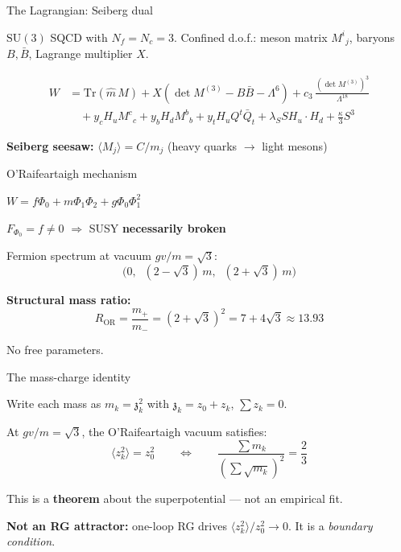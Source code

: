\documentclass[aspectratio=169,12pt]{beamer}
\newcommand{\zch}{\mathfrak{z}}
\begin{document}
\begin{frame}{The Lagrangian: Seiberg dual}

$\mathrm{SU}(3)$ SQCD with $N_f = N_c = 3$.
Confined d.o.f.: meson matrix $M^i{}_j$, baryons $B, \bar B$,
Lagrange multiplier $X$.

\begin{equation*}
\begin{split}
W &= \mathrm{Tr}(\hat m\, M)
  + X\!\left(\det M^{(3)} - B\bar B - \Lambda^{6}\right)
  + c_3\,\frac{(\det M^{(3)})^3}{\Lambda^{18}}\\
&\quad + y_c H_u M^c{}_c + y_b H_d M^b{}_b
  + y_t H_u Q^t \bar Q_t
  + \lambda_S S H_u\!\cdot\!H_d + \tfrac{\kappa}{3}S^3
\end{split}
\end{equation*}

\medskip
\textbf{Seiberg seesaw:}
$\langle M_j\rangle = C/m_j$
\quad (heavy quarks $\to$ light mesons)

\end{frame}

\begin{frame}{O'Raifeartaigh mechanism}

$W = f\Phi_0 + m\Phi_1\Phi_2 + g\Phi_0\Phi_1^2$

\medskip
$F_{\Phi_0} = f \neq 0$ \quad$\Longrightarrow$\quad
SUSY \textbf{necessarily broken}

\bigskip
Fermion spectrum at vacuum $gv/m = \sqrt{3}$:
\begin{equation*}
\bigl(0,\;\; (2{-}\sqrt{3})\,m,\;\; (2{+}\sqrt{3})\,m\bigr)
\end{equation*}

\pause
\textbf{Structural mass ratio:}
\begin{equation*}
R_{\mathrm{OR}} = \frac{m_+}{m_-}
= (2+\sqrt{3})^2 = 7 + 4\sqrt{3} \approx 13.93
\end{equation*}

No free parameters.

\end{frame}

\begin{frame}{The mass-charge identity}

Write each mass as $m_k = \zch_k^2$ with
$\zch_k = z_0 + z_k$, $\sum z_k = 0$.

\bigskip
At $gv/m = \sqrt{3}$, the O'Raifeartaigh vacuum satisfies:
\begin{equation*}
\boxed{\langle z_k^2\rangle = z_0^2}
\qquad\Longleftrightarrow\qquad
\frac{\sum m_k}{(\sum\sqrt{m_k})^2} = \frac{2}{3}
\end{equation*}

\bigskip
This is a \textbf{theorem} about the superpotential ---
not an empirical fit.

\medskip
\textbf{Not an RG attractor:} one-loop RG drives
$\langle z_k^2\rangle/z_0^2 \to 0$.
It is a \emph{boundary condition}.

\end{frame}
\end{document}
